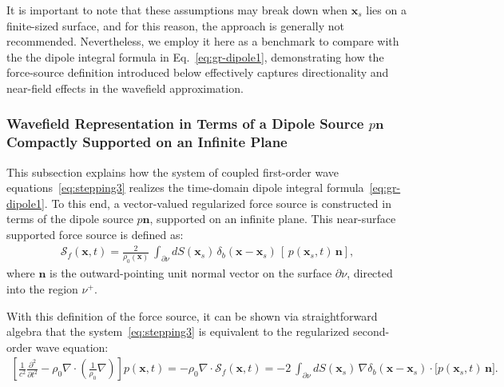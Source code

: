 \documentclass[11pt,reqno]{amsart}
\theoremstyle{remark}
\theoremstyle{italic_lemma}
\newcommand{\bx}{\boldsymbol{x}}
\newcommand{\bn}{\boldsymbol{n}}
\begin{document}
\noindent
It is important to note that these assumptions may break down when \( \bx_s \) lies on a finite-sized surface, and for this reason, the approach is generally not recommended. Nevertheless, we employ it here as a benchmark to compare with the the dipole integral formula in Eq.~\eqref{eq:gr-dipole1}, demonstrating how the force-source definition introduced below effectively captures directionality and near-field effects in the wavefield approximation.


\subsubsection{Wavefield Representation in Terms of a Dipole Source \( p \bn \) Compactly Supported on an Infinite Plane}
\label{sec:force-source}

This subsection explains how the system of coupled first-order wave equations~\eqref{eq:stepping3} realizes the time-domain dipole integral formula~\eqref{eq:gr-dipole1}. To this end, a vector-valued regularized force source is constructed in terms of the dipole source \( p \bn \), supported on an infinite plane. This near-surface supported force source is defined as:
\begin{align} \label{eq:force}
\boldsymbol{\mathcal{S}}_f(\bx, t) =  \frac{2}{\rho_0(\bx)} \ 
\int_{\partial \nu} dS(\bx_s) \, \delta_b(\bx - \bx_s) \, \left[ \, p(\bx_s, t)    \, \bn \right],
\end{align}
where \( \bn \) is the outward-pointing unit normal vector on the surface \( \partial \nu \), directed into the region \( \nu^+ \).

With this definition of the force source, it can be shown via straightforward algebra that the system~\eqref{eq:stepping3} is equivalent to the regularized second-order wave equation:
\begin{align} \label{eq:wave-dipole}
\left[\frac{1}{c^2} \frac{\partial^2}{\partial t^2} - \rho_0 \nabla \cdot \left( \frac{1}{\rho_0} \nabla \right) \right] p(\bx, t) = -\rho_0 \nabla \cdot \boldsymbol{\mathcal{S}}_f(\bx,t) =
- 2 \ \int_{\partial \nu} dS(\bx_s) \, \nabla \delta_b(\bx - \bx_s) \cdot \Big[ p(\bx_s, t) \, \bn \Big] .
\end{align}
\end{document}
